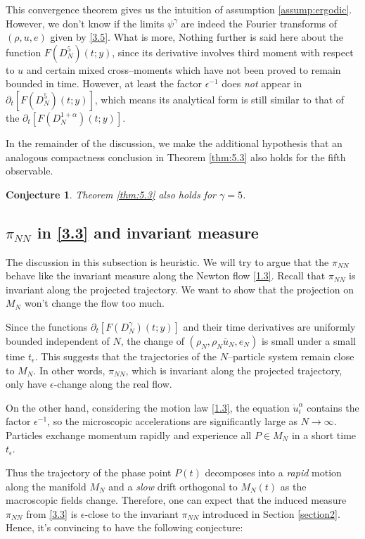 \documentclass[11pt]{article}
\newtheorem{conjecture}{Conjecture}
\begin{document}
This convergence theorem gives us the intuition of assumption \ref{assump:ergodic}. However, we don't know if the limits $\psi^\gamma$ are indeed the Fourier transforms of $(\rho,u,e)$ given by \eqref{3.5}. What is more, Nothing further is said here about the function $F(D^5_N)(t;y)$, since its derivative involves third moment with respect to $u$ and certain mixed cross--moments which have not been proved to remain bounded in time. However, at least the factor $\epsilon^{-1}$ does \emph{not} appear in $\partial_t[F(D^{5}_N)(t;y)]$, which means its analytical form is still similar to that of the $\partial_t[F(D_{N}^{1+\alpha})(t;y)]$. 

In the remainder of the discussion, we make the additional hypothesis that an analogous compactness conclusion in Theorem \ref{thm:5.3} also holds for the fifth observable.

\begin{conjecture}\label{conj1}
    Theorem \ref{thm:5.3} also holds for $\gamma=5$.
\end{conjecture}


\subsection{ $\pi_{NN}$ in \eqref{3.3} and invariant measure }\label{sec:ergodic}
The discussion in this subsection is heuristic. We will try to argue that the $\pi_{NN}$ behave like the invariant measure along the Newton flow \eqref{1.3}. Recall that $\pi_{NN}$ is invariant along the projected trajectory. We want to show that the projection on $M_N$ won't change the flow too much. 

Since the functions $\partial_t[F(D_{N}^{\gamma})(t;y)]$ and their time derivatives are uniformly bounded independent of $N$, the change of $(\rho_N,\rho_N\bar{u}_N,e_N)$ is small under a small time $t_\epsilon$. This suggests that the trajectories of the $N$--particle system remain close to $M_N$. In other words, $\pi_{NN}$, which is invariant along the projected trajectory, only have $\epsilon$-change along the real flow. 

On the other hand, considering the motion law \eqref{1.3}, the equation $\dot u_i^\alpha$ contains the factor $\epsilon^{-1}$, so the microscopic accelerations are significantly large as $N\to\infty$. Particles exchange momentum rapidly and experience all $P\in M_N$ in a short time $t_\epsilon$. 


Thus the trajectory of the phase point $P(t)$ decomposes into a \emph{rapid} motion along the manifold $M_N$ and a \emph{slow} drift orthogonal to $M_N(t)$ as the macroscopic fields change. Therefore, one can expect that the induced measure $\pi_{NN}$ from \eqref{3.3} is $\epsilon$-close to the invariant $\pi_{NN}$ introduced in Section \ref{section2}. Hence, it's convincing to have the following conjecture:
\end{document}
